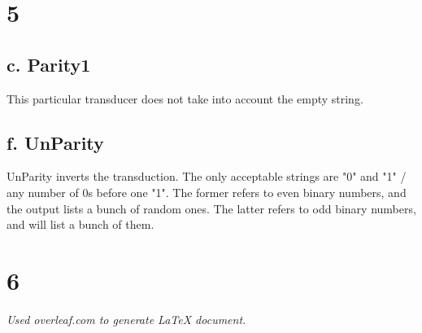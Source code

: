 \documentclass[12pt, letterpaper]{article}
\begin{document}
\section{5}
\subsection{c. Parity1}
This particular transducer does not take into account the empty string. 

\subsection{f. UnParity}
UnParity inverts the transduction. The only acceptable strings are "0" and "1" / any number of 0s before one "1". The former refers to even binary numbers, and the output lists a bunch of random ones. The latter refers to odd binary numbers, and will list a bunch of them. 

\section{6}

\begin{center}
\textit{Used overleaf.com to generate LaTeX document.}
\end{center}
\end{document}
